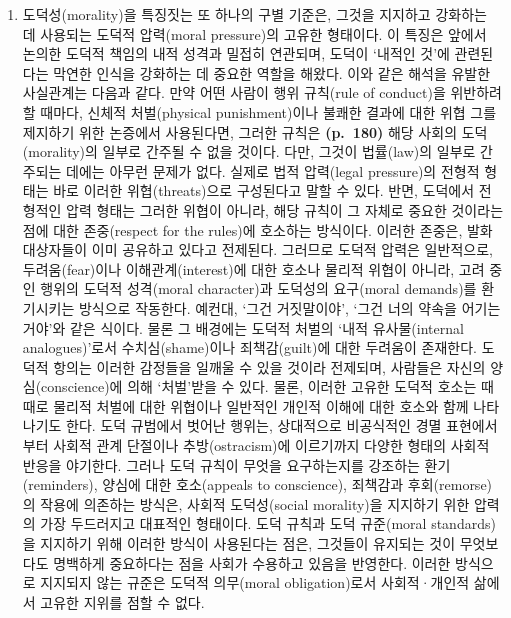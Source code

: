 \begin{enumerate}
\def\labelenumi{(\roman{enumi})}
\setcounter{enumi}{3}
\tightlist
\item
  도덕성(morality)을 특징짓는 또 하나의 구별 기준은, 그것을 지지하고
  강화하는 데 사용되는 도덕적 압력(moral pressure)의 고유한 형태이다. 이
  특징은 앞에서 논의한 도덕적 책임의 내적 성격과 밀접히 연관되며, 도덕이
  `내적인 것'에 관련된다는 막연한 인식을 강화하는 데 중요한 역할을
  해왔다. 이와 같은 해석을 유발한 사실관계는 다음과 같다. 만약 어떤
  사람이 행위 규칙(rule of conduct)을 위반하려 할 때마다,
   신체적 처벌(physical punishment)이나 불쾌한 결과에
  대한 위협 그를 제지하기 위한 논증에서 사용된다면, 그러한
  규칙은 \textbf{(p.~180)} 해당 사회의 도덕(morality)의 일부로 간주될 수
  없을 것이다. 다만, 그것이 법률(law)의 일부로 간주되는 데에는 아무런
  문제가 없다. 실제로 법적 압력(legal pressure)의 전형적 형태는 바로
  이러한 위협(threats)으로 구성된다고 말할 수 있다. 반면, 도덕에서
  전형적인 압력 형태는 그러한 위협이 아니라, 해당 규칙이 그 자체로
  중요한 것이라는 점에 대한 존중(respect for the rules)에 호소하는
  방식이다. 이러한 존중은, 발화 대상자들이 이미 공유하고 있다고
  전제된다. 그러므로 도덕적 압력은 일반적으로, 두려움(fear)이나
  이해관계(interest)에 대한 호소나 물리적 위협이 아니라, 고려 중인
  행위의 도덕적 성격(moral character)과 도덕성의 요구(moral demands)를
  환기시키는 방식으로 작동한다. 예컨대, `그건 거짓말이야', `그건 너의
  약속을 어기는 거야'와 같은 식이다. 물론 그 배경에는 도덕적 처벌의
  `내적 유사물(internal analogues)'로서 수치심(shame)이나
  죄책감(guilt)에 대한 두려움이 존재한다. 도덕적 항의는 이러한 감정들을
  일깨울 수 있을 것이라 전제되며, 사람들은 자신의 양심(conscience)에
  의해 `처벌'받을 수 있다. 물론, 이러한 고유한 도덕적 호소는 때때로
  물리적 처벌에 대한 위협이나 일반적인 개인적 이해에 대한 호소와 함께
  나타나기도 한다. 도덕 규범에서 벗어난 행위는, 상대적으로 비공식적인
  경멸 표현에서부터 사회적 관계 단절이나 추방(ostracism)에 이르기까지
  다양한 형태의 사회적 반응을 야기한다. 그러나 도덕 규칙이 무엇을
  요구하는지를 강조하는 환기(reminders), 양심에 대한 호소(appeals to
  conscience), 죄책감과 후회(remorse)의 작용에 의존하는 방식은, 사회적
  도덕성(social morality)을 지지하기 위한 압력의 가장 두드러지고
  대표적인 형태이다. 도덕 규칙과 도덕 규준(moral standards)을 지지하기
  위해 이러한 방식이 사용된다는 점은, 그것들이 유지되는 것이 무엇보다도
  명백하게 중요하다는 점을 사회가 수용하고 있음을 반영한다. 이러한
  방식으로 지지되지 않는 규준은 도덕적 의무(moral obligation)로서
  사회적·개인적 삶에서 고유한 지위를 점할 수 없다.
\end{enumerate}

